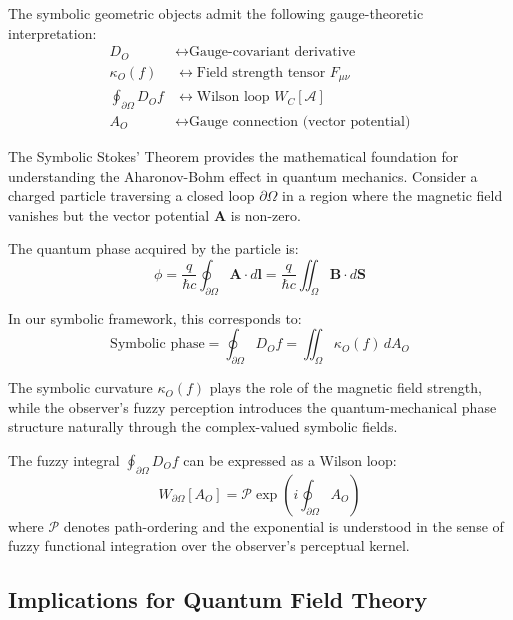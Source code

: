 \begin{proposition}
\label{prop:bk4_gauge_dictionary}
The symbolic geometric objects admit the following gauge-theoretic interpretation:
\begin{align}
D_O &\leftrightarrow \text{Gauge-covariant derivative} \\
\kappa_O(f) &\leftrightarrow \text{Field strength tensor } F_{\mu\nu} \\
\oint_{\partial\Omega} D_O f &\leftrightarrow \text{Wilson loop } W_C[\mathcal{A}] \\
A_O &\leftrightarrow \text{Gauge connection (vector potential)}
\end{align}
\end{proposition}

\begin{remark}
\label{remark:bk4_aharonov_bohm}
The Symbolic Stokes' Theorem provides the mathematical foundation for understanding the Aharonov-Bohm effect in quantum mechanics. Consider a charged particle traversing a closed loop $\partial\Omega$ in a region where the magnetic field vanishes but the vector potential $\mathbf{A}$ is non-zero.

The quantum phase acquired by the particle is:
\[
\phi = \frac{q}{\hbar c} \oint_{\partial\Omega} \mathbf{A} \cdot d\mathbf{l} = \frac{q}{\hbar c} \iint_\Omega \mathbf{B} \cdot d\mathbf{S}
\]

In our symbolic framework, this corresponds to:
\[
\text{Symbolic phase} = \oint_{\partial\Omega} D_O f = \iint_\Omega \kappa_O(f) \, dA_O
\]

The symbolic curvature $\kappa_O(f)$ plays the role of the magnetic field strength, while the observer's fuzzy perception introduces the quantum-mechanical phase structure naturally through the complex-valued symbolic fields.
\end{remark}

\begin{corollary}
\label{corollary:bk4_wilson_loop}
The fuzzy integral $\oint_{\partial\Omega} D_O f$ can be expressed as a Wilson loop:
\[
W_{\partial\Omega}[A_O] = \mathcal{P} \exp\left(i \oint_{\partial\Omega} A_O\right)
\]
where $\mathcal{P}$ denotes path-ordering and the exponential is understood in the sense of fuzzy functional integration over the observer's perceptual kernel.
\end{corollary}

\subsection{Implications for Quantum Field Theory}
\label{subsec:bk4_implications_for_quantum_field_theory}

